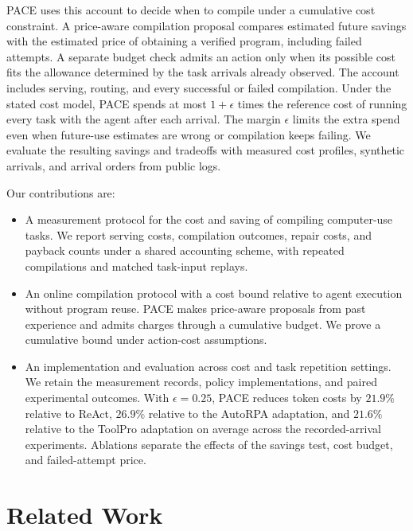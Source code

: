 PACE uses this account to decide when to compile under a cumulative cost constraint.
A price-aware compilation proposal compares estimated future savings with the estimated price of obtaining a verified program, including failed attempts.
A separate budget check admits an action only when its possible cost fits the allowance determined by the task arrivals already observed.
The account includes serving, routing, and every successful or failed compilation.
Under the stated cost model, PACE spends at most $1+\epsilon$ times the reference cost of running every task with the agent after each arrival.
The margin $\epsilon$ limits the extra spend even when future-use estimates are wrong or compilation keeps failing.
We evaluate the resulting savings and tradeoffs with measured cost profiles, synthetic arrivals, and arrival orders from public logs.

Our contributions are:
\begin{itemize}
\item A measurement protocol for the cost and saving of compiling computer-use tasks.
We report serving costs, compilation outcomes, repair costs, and payback counts under a shared accounting scheme, with repeated compilations and matched task-input replays.
\item An online compilation protocol with a cost bound relative to agent execution without program reuse.
PACE makes price-aware proposals from past experience and admits charges through a cumulative budget.
We prove a cumulative bound under action-cost assumptions.
\item An implementation and evaluation across cost and task repetition settings.
We retain the measurement records, policy implementations, and paired experimental outcomes.
With $\epsilon=0.25$, PACE reduces token costs by $21.9\%$ relative to ReAct, $26.9\%$ relative to the AutoRPA adaptation, and $21.6\%$ relative to the ToolPro adaptation on average across the recorded-arrival experiments.
Ablations separate the effects of the savings test, cost budget, and failed-attempt price.
\end{itemize}






\section{Related Work}
\label{sec:related}

